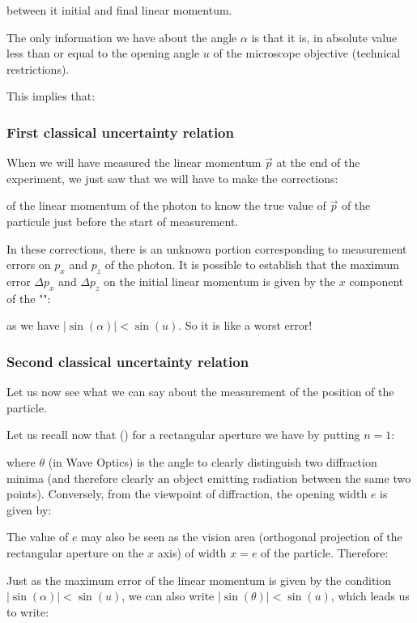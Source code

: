 	between it initial and final linear momentum.

	The only information we have about the angle $\alpha$ is that it is, in absolute value less than or equal to the opening angle $u$ of the microscope objective (technical restrictions).

	This implies that:
	
	
	\subsubsection{First classical uncertainty relation}
	When we will have measured the linear momentum $\vec{p}$ at the end of the experiment, we just saw that we will have to make the corrections:
	
	of the linear momentum of the photon to know the true value of $\vec{p}$ of the particule just before the start of measurement.

	In these corrections, there is an unknown portion corresponding to measurement errors on $p_x$ and $p_z$ of the photon. It is possible to establish that the maximum error $\Delta p_x$ and $\Delta p_z$ on the initial linear momentum is given by the $x$ component of the "":
	
	as we have $|\sin(\alpha)|<\sin(u)$. So it is like a worst error!
	
	\subsubsection{Second classical uncertainty relation}
	Let us now see what we can say about the measurement of the position of the particle.

	Let us recall now that () for a rectangular aperture we have by putting $n=1$:
	
	where $\theta$ (in Wave Optics) is the angle to clearly distinguish two diffraction minima (and therefore clearly an object emitting radiation between the same two points). Conversely, from the viewpoint of diffraction, the opening width $e$ is given by:
	
	The value of $e$ may also be seen as the vision area (orthogonal projection of the rectangular aperture on the $x$ axis) of width $x=e$ of the particle. Therefore:
	
	Just as the maximum error of the linear momentum is given by the condition $|\sin(\alpha)|<\sin(u)$, we can also write  $|\sin(\theta)|<\sin(u)$, which leads us to write:
	
